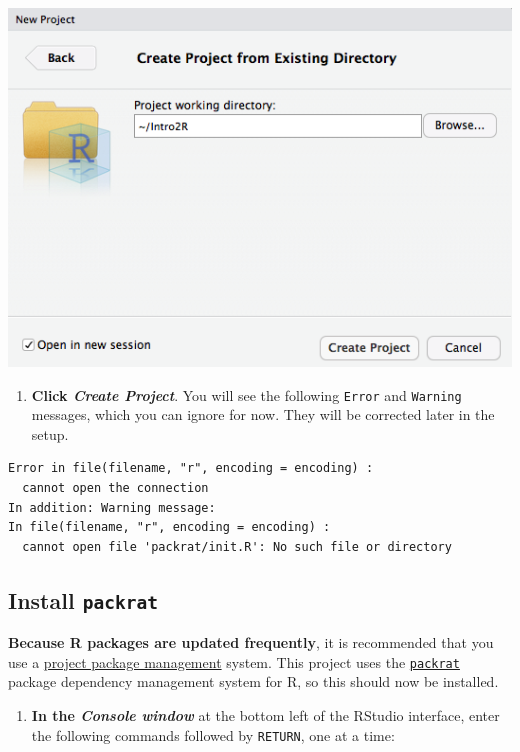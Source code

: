 \documentclass[]{book}
\providecommand{\tightlist}{%
  \setlength{\itemsep}{0pt}\setlength{\parskip}{0pt}}
\theoremstyle{definition}
\theoremstyle{definition}
\theoremstyle{definition}
\theoremstyle{remark}
\begin{document}
\includegraphics{images/RStudio_create_from_existing_directory_window.png}

\begin{enumerate}
\def\labelenumi{\arabic{enumi}.}
\setcounter{enumi}{5}
\tightlist
\item
  \textbf{Click \emph{Create Project}}. You will see the following
  \texttt{Error} and \texttt{Warning} messages, which you can ignore for
  now. They will be corrected later in the setup.
\end{enumerate}

\begin{verbatim}
Error in file(filename, "r", encoding = encoding) : 
  cannot open the connection
In addition: Warning message:
In file(filename, "r", encoding = encoding) :
  cannot open file 'packrat/init.R': No such file or directory
\end{verbatim}

\hypertarget{install-packrat}{%
\subsection{\texorpdfstring{Install
\texttt{packrat}}{Install packrat}}\label{install-packrat}}

\textbf{Because R packages are updated frequently}, it is recommended
that you use a
\href{http://r.stuzog.com/RStudio.html\#project-package-management}{project
package management} system. This project uses the
\href{https://rstudio.github.io/packrat/}{\texttt{packrat}} package
dependency management system for R, so this should now be installed.

\begin{enumerate}
\def\labelenumi{\arabic{enumi}.}
\setcounter{enumi}{6}
\tightlist
\item
  \textbf{In the \emph{Console window}} at the bottom left of the
  RStudio interface, enter the following commands followed by
  \texttt{RETURN}, one at a time:
\end{enumerate}
\end{document}
